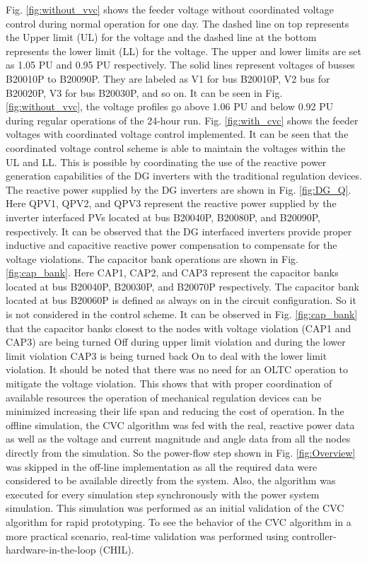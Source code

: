 Fig. \ref{fig:without_vvc} shows the feeder voltage without coordinated voltage control during normal operation for one day. The dashed line on top represents the Upper limit (UL) for the voltage and the dashed line at the bottom represents the lower limit (LL) for the voltage. The upper and lower limits are set as 1.05 PU and 0.95 PU respectively. The solid lines represent voltages of busses B20010P to B20090P. They are labeled as V1 for bus B20010P, V2 bus for B20020P, V3 for bus B20030P, and so on. It can be seen in Fig. \ref{fig:without_vvc}, the voltage profiles go above 1.06 PU and below 0.92 PU during regular operations of the 24-hour run. 
Fig. \ref{fig:with_cvc} shows the feeder voltages with coordinated voltage control implemented. It can be seen that the coordinated voltage control scheme is able to maintain the voltages within the UL and LL. This is possible by coordinating the use of the reactive power generation capabilities of the DG inverters with the traditional regulation devices. The reactive power supplied by the DG inverters are shown in Fig. \ref{fig:DG_Q}. Here QPV1, QPV2, and QPV3 represent the reactive power supplied by the inverter interfaced PVs located at bus B20040P, B20080P, and B20090P, respectively. It can be observed that the DG interfaced inverters provide proper inductive and capacitive reactive power compensation to compensate for the voltage violations. The capacitor bank operations are shown in Fig. \ref{fig:cap_bank}. Here CAP1, CAP2, and CAP3 represent the capacitor banks located at bus B20040P, B20030P, and B20070P respectively. The capacitor bank located at bus B20060P is defined as always on in the circuit configuration. So it is not considered in the control scheme. It can be observed in Fig. \ref{fig:cap_bank} that the capacitor banks closest to the nodes with voltage violation (CAP1 and CAP3) are being turned Off during upper limit violation and during the lower limit violation CAP3 is being turned back On to deal with the lower limit violation. It should be noted that there was no need for an OLTC operation to mitigate the voltage violation. This shows that with proper coordination of available resources the operation of mechanical regulation devices can be minimized increasing their life span and reducing the cost of operation. In the offline simulation, the CVC algorithm was fed with the real, reactive power data as well as the voltage and current magnitude and angle data from all the nodes directly from the simulation. So the power-flow step shown in Fig. \ref{fig:Overview} was skipped in the off-line implementation as all the required data were considered to be available directly from the system. Also, the algorithm was executed for every simulation step synchronously with the power system simulation. This simulation was performed as an initial validation of the CVC algorithm for rapid prototyping. To see the behavior of the CVC algorithm in a more practical scenario, real-time validation was performed using controller-hardware-in-the-loop (CHIL).

